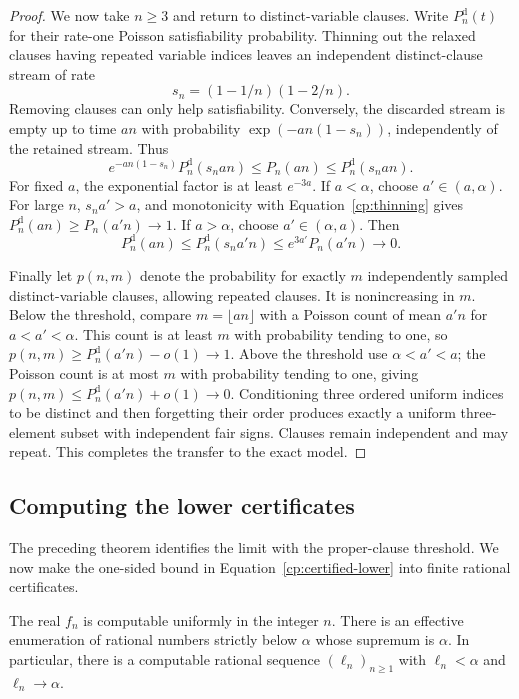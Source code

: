 \begin{proof}
We now take $n\ge3$ and return to distinct-variable clauses. Write $P_n^{\mathrm d}(t)$
for their rate-one Poisson satisfiability probability. Thinning out the
relaxed clauses having repeated variable indices leaves an independent
distinct-clause stream of rate
\[
 s_n=(1-1/n)(1-2/n).
\]
Removing clauses can only help satisfiability. Conversely, the discarded
stream is empty up to time $an$ with probability
$\exp(-an(1-s_n))$, independently of the retained stream. Thus
\begin{equation}\label{cp:thinning}
 e^{-an(1-s_n)}P_n^{\mathrm d}(s_n a n)
 \le P_n(an)\le P_n^{\mathrm d}(s_n a n).
\end{equation}
For fixed $a$, the exponential factor is at least $e^{-3a}$.
If $a<\alpha$, choose $a'\in(a,\alpha)$. For large $n$, $s_na'>a$,
and monotonicity with Equation~\eqref{cp:thinning} gives
$P_n^{\mathrm d}(an)\ge P_n(a'n)\to1$.
If $a>\alpha$, choose $a'\in(\alpha,a)$. Then
\[
 P_n^{\mathrm d}(an)
 \le P_n^{\mathrm d}(s_na'n)
 \le e^{3a'}P_n(a'n)\longrightarrow0.
\]

Finally let $p(n,m)$ denote the probability for exactly $m$ independently
sampled distinct-variable clauses, allowing repeated clauses.
It is nonincreasing in $m$. Below the threshold, compare
$m=\lfloor an\rfloor$ with a Poisson count of mean $a'n$ for
$a<a'<\alpha$. This count is at least $m$ with probability tending to
one, so $p(n,m)\ge P_n^{\mathrm d}(a'n)-o(1)\to1$.
Above the threshold use $\alpha<a'<a$; the Poisson count is at most $m$
with probability tending to one, giving
$p(n,m)\le P_n^{\mathrm d}(a'n)+o(1)\to0$.
Conditioning three ordered uniform indices to be distinct and then
forgetting their order produces exactly a uniform three-element subset
with independent fair signs. Clauses remain
independent and may repeat. This completes the transfer to the exact model.
\end{proof}

\subsection{Computing the lower certificates}

The preceding theorem identifies the limit with the proper-clause
threshold. We now make the one-sided bound in
Equation~\eqref{cp:certified-lower} into finite rational certificates.

\begin{proposition}
\label{cp:finite-computation}
The real $f_n$ is computable uniformly in the integer $n$. There is an
effective enumeration of rational numbers strictly below $\alpha$ whose
supremum is $\alpha$. In particular, there is a computable rational
sequence $(\ell_n)_{n\ge1}$ with $\ell_n<\alpha$ and
$\ell_n\to\alpha$.
\end{proposition}

